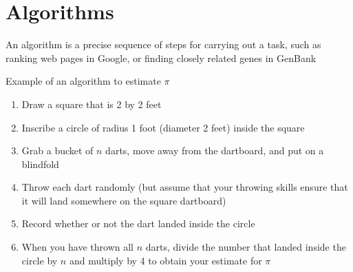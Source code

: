 \documentclass[8pt,a4paper,compress]{beamer}
\begin{document}
\section{Algorithms}
\begin{frame}[fragile]
\pause

An algorithm is a precise sequence of steps for carrying out a task, such as ranking web pages in Google, or finding closely related genes in GenBank

\pause
\bigskip


\begin{minipage}{200pt}
Example of an algorithm to estimate $\pi$

\begin{enumerate}
\item Draw a square that is 2 by 2 feet
\item Inscribe a circle of radius 1 foot (diameter 2 feet) inside the square
\item Grab a bucket of $n$ darts, move away from the dartboard, and put on a blindfold
\item Throw each dart randomly (but assume that your throwing skills ensure that it will land somewhere on the square dartboard)
\item Record whether or not the dart landed inside the circle
\item When you have thrown all $n$ darts, divide the number that landed inside the circle by $n$ and multiply by 4 to obtain your estimate for $\pi$
\end{enumerate}
\end{minipage}%
\hfill
\begin{minipage}{100pt}
\begin{center}
\end{center}
\end{minipage}
\end{frame}
\end{document}
